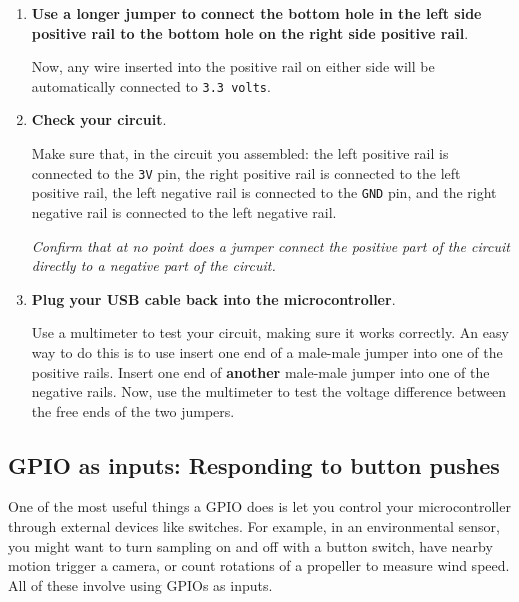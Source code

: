 \begin{enumerate}
	\item \textbf{Use a longer jumper to connect the bottom hole in the left side positive rail to the bottom hole on the right side positive rail}.

	Now, any wire inserted into the positive rail on either side will be automatically connected to \texttt{3.3 volts}.

	\item \textbf{Check your circuit}.

	Make sure that, in the circuit you assembled: the left positive rail is connected to the \texttt{3V} pin, the right positive rail is connected to the left positive rail, the left negative rail is connected to the \texttt{GND} pin, and the right negative rail is connected to the left negative rail.

	\emph{Confirm that at no point does a jumper connect the positive part of the circuit directly to a negative part of the circuit.}

	\item \textbf{Plug your USB cable back into the microcontroller}.

	Use a multimeter to test your circuit, making sure it works correctly.
	An easy way to do this is to use insert one end of a male-male jumper into one of the positive rails.
	Insert one end of \textbf{another} male-male jumper into one of the negative rails.
	Now, use the multimeter to test the voltage difference between the free ends of the two jumpers.

\end{enumerate}

\subsection{GPIO as inputs: Responding to button pushes}
One of the most useful things a GPIO does is let you control your microcontroller through external devices like switches.
For example, in an environmental sensor, you might want to turn sampling on and off with a button switch, have nearby motion trigger a camera, or count rotations of a propeller to measure wind speed. All of these involve using GPIOs as inputs.

